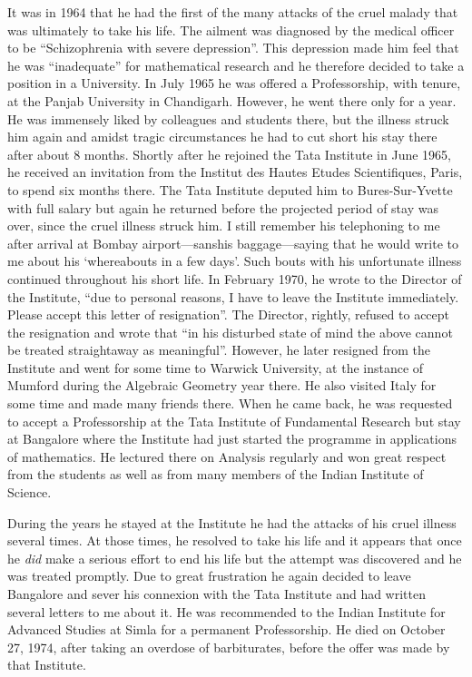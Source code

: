 It was in 1964 that he had the first of the many attacks of the cruel 
malady that was ultimately to take his life. The ailment was diagnosed 
by the medical officer to be ``Schizophrenia with severe depression''. 
This depression made him feel that he was ``inadequate'' for 
mathematical research and he therefore decided to take a position in a 
University. In July 1965 he was offered a Professorship, with tenure, 
at the Panjab University in Chandigarh. However, he went there only 
for a year. He was immensely liked by colleagues and students there, 
but the illness struck him again and amidst tragic circumstances he 
had to cut short his stay there after about 8 months. Shortly after he 
rejoined the Tata Institute in June 1965, he received an invitation 
from the Institut des Hautes Etudes Scientifiques, Paris, to spend 
six months there. The Tata Institute deputed him to Bures-Sur-Yvette 
with full salary but again he returned before the projected period of 
stay was over, since the cruel illness struck him. I still remember 
his telephoning to me after arrival at Bombay 
airport---sans\pageoriginale his baggage---saying that he would write 
to me about his `whereabouts in a few days'. Such bouts with his 
unfortunate illness continued throughout his short life. In  February 
1970, he wrote to the Director of the Institute, ``due to personal 
reasons, I have to leave the Institute immediately. Please accept this 
letter of resignation''. The Director, rightly, refused to accept the 
resignation and wrote that ``in his disturbed state of mind the above 
cannot be treated straightaway as meaningful''. However, he later 
resigned from the Institute and went for some time to Warwick 
University, at the instance of Mumford during the Algebraic Geometry 
year there. He also visited Italy for some time and made many friends 
there. When he came back, he was requested to accept a Professorship 
at the Tata Institute of Fundamental Research but stay at Bangalore 
where the Institute had just started the programme in applications of 
mathematics. He lectured there on Analysis regularly and won great 
respect from the students as well as from many members of the Indian 
Institute of Science.

During the years he stayed at the Institute he had the attacks of his 
cruel illness several times. At those times, he resolved to take his 
life and it appears that once he \emph{did} make a serious effort to 
end his life but the attempt was discovered and he was treated 
promptly. Due to great frustration he again decided to leave Bangalore 
and sever his connexion with the Tata Institute and had written 
several letters to me about it. He was recommended to the Indian 
Institute for Advanced Studies at Simla for a permanent Professorship. 
He died on October 27, 1974, after taking an overdose of barbiturates, 
before the offer was made by that Institute. 

